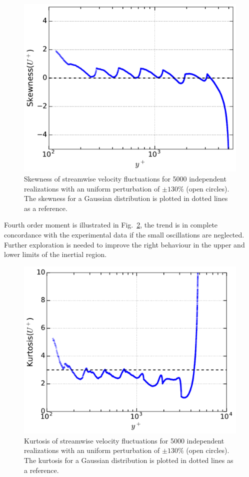 \documentclass[aps,reprint,amsmath,amssymb,pra,floatfix]{revtex4-1}%
\begin{document}
\begin{figure}[tb]
\includegraphics[scale=0.46]{figures/skewness_5000_assembles_un130}
\caption{\label{fig:skewun130} Skewness of streamwise velocity fluctuations for 5000 independent realizations with an uniform perturbation of $\pm 130\%$ (open circles). The skewness for a Gaussian distribution is plotted in dotted lines as a reference.}
\end{figure}
Fourth order moment is illustrated in Fig.~\ref{fig:kurtun130}, the trend is in complete concordance with the experimental data if the small oscillations are neglected. Further exploration is needed to improve the right behaviour in the upper and lower limits of the inertial region.
\begin{figure}[tbh] 
\includegraphics[scale=0.46]{figures/kurtosis_5000_assembles_un130}
\caption{\label{fig:kurtun130} Kurtosis of streamwise velocity fluctuations for 5000 independent realizations with an uniform perturbation of $\pm 130\%$ (open circles). The kurtosis for a Gaussian distribution is plotted in dotted lines as a reference.} 
\end{figure}
\end{document}
